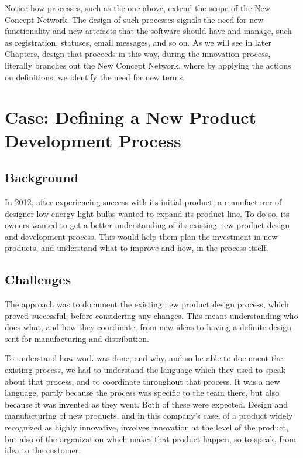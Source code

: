 \documentclass[graybox,envcountchap,sectrefs]{svmono}
\newcommand{\ncnf}{New Concept Network}
\begin{document}
Notice how processes, such as the one above, extend the scope of the \ncnf. The design of such processes signals the need for new functionality and new artefacts that the software should have and manage, such as registration, statuses, email messages, and so on. As we will see in later Chapters, design that proceeds in this way, during the innovation process, literally branches out the \ncnf, where by applying the actions on definitions, we identify the need for new terms.


\chapter{Case: Defining a New Product Development Process}\label{c:case:defining-new-product-development-process}

\section{Background}
In 2012, after experiencing success with its initial product, a manufacturer of designer low energy light bulbs wanted to expand its product line. To do so, its owners wanted to get a better understanding of its existing new product design and development process. This would help them plan the investment in new products, and understand what to improve and how, in the process itself.

\section{Challenges}
The approach was to document the existing new product design process, which proved successful, before considering any changes. This meant understanding who does what, and how they coordinate, from new ideas to having a definite design sent for manufacturing and distribution. 

To understand how work was done, and why, and so be able to document the existing process, we had to understand the language which they used to speak about that process, and to coordinate throughout that process. It was a new language, partly because the process was specific to the team there, but also because it was invented as they went. Both of these were expected. Design and manufacturing of new products, and in this company's case, of a product widely recognized as highly innovative, involves innovation at the level of the product, but also of the organization which makes that product happen, so to speak, from idea to the customer. 
\end{document}
